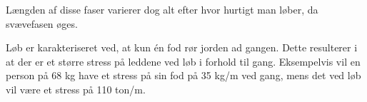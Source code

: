 Længden af disse faser varierer dog alt efter hvor hurtigt man løber, da svævefasen øges. 

Løb er karakteriseret ved, at kun én fod rør jorden ad gangen. Dette resulterer i at der er et større stress på leddene ved løb i forhold til gang. Eksempelvis vil en person på 68 kg have et stress på sin fod på 35 kg/m ved gang, mens det ved løb vil være et stress på 110 ton/m. 














